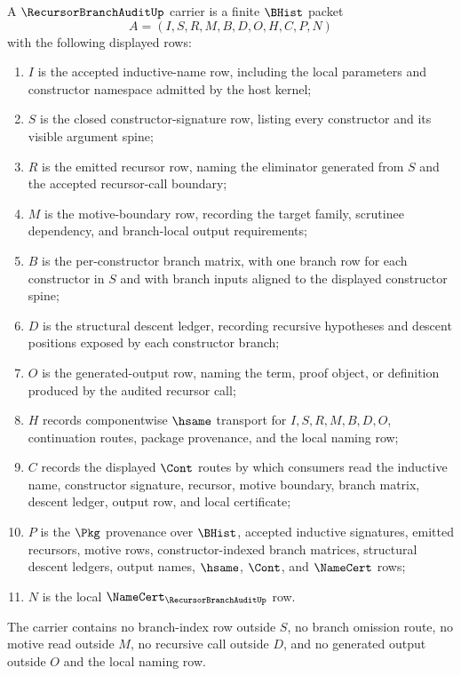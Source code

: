 \begin{definition}
\label{def:recursor-branch-audit-carrier}
A $\RecursorBranchAuditUp$ carrier is a finite $\BHist$ packet
$$
A=(I,S,R,M,B,D,O,H,C,P,N)
$$
with the following displayed rows:
\begin{enumerate}
\item $I$ is the accepted inductive-name row, including the local parameters and constructor namespace admitted by the host kernel;
\item $S$ is the closed constructor-signature row, listing every constructor and its visible argument spine;
\item $R$ is the emitted recursor row, naming the eliminator generated from $S$ and the accepted recursor-call boundary;
\item $M$ is the motive-boundary row, recording the target family, scrutinee dependency, and branch-local output requirements;
\item $B$ is the per-constructor branch matrix, with one branch row for each constructor in $S$ and with branch inputs aligned to the displayed constructor spine;
\item $D$ is the structural descent ledger, recording recursive hypotheses and descent positions exposed by each constructor branch;
\item $O$ is the generated-output row, naming the term, proof object, or definition produced by the audited recursor call;
\item $H$ records componentwise $\hsame$ transport for $I,S,R,M,B,D,O$, continuation routes, package provenance, and the local naming row;
\item $C$ records the displayed $\Cont$ routes by which consumers read the inductive name, constructor signature, recursor, motive boundary, branch matrix, descent ledger, output row, and local certificate;
\item $P$ is the $\Pkg$ provenance over $\BHist$, accepted inductive signatures, emitted recursors, motive rows, constructor-indexed branch matrices, structural descent ledgers, output names, $\hsame$, $\Cont$, and $\NameCert$ rows;
\item $N$ is the local $\NameCert_{\RecursorBranchAuditUp}$ row.
\end{enumerate}
The carrier contains no branch-index row outside $S$, no branch omission route, no motive read outside $M$, no recursive call outside $D$, and no generated output outside $O$ and the local naming row.
\end{definition}


